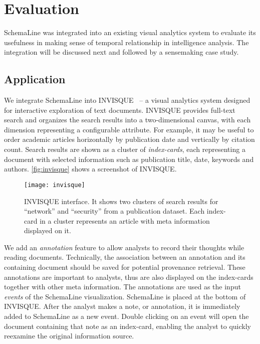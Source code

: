 \section{Evaluation}
\label{sub:sl-evaluation}
SchemaLine was integrated into an existing visual analytics system to evaluate its usefulness in making sense of temporal relationship in intelligence analysis. The integration will be discussed next and followed by a sensemaking case study.

\subsection{Application}
We integrate SchemaLine into INVISQUE~\cite{Wong2011} -- a visual analytics system designed for interactive exploration of text documents. INVISQUE provides full-text search and organizes the search results into a two-dimensional canvas, with each dimension representing a configurable attribute. For example, it may be useful to order academic articles horizontally by publication date and vertically by citation count. Search results are shown as a cluster of \emph{index-cards}, each representing a document with selected information such as publication title, date, keywords and authors. \autoref{fig:invisque} shows a screenshot of INVISQUE.

\begin{figure}[!htb]
	\centering
	\texttt{[image: invisque]}
	\caption{INVISQUE interface. It shows two clusters of search results for ``network'' and ``security'' from a publication dataset. Each index-card in a cluster represents an article with meta information displayed on it.}
	\label{fig:invisque}
\end{figure}

We add an \emph{annotation} feature to allow analysts to record their thoughts while reading documents. Technically, the association between an annotation and its containing document should be saved for potential provenance retrieval. These annotations are important to analysts, thus are also displayed on the index-cards together with other meta information. The annotations are used  as the input \emph{events} of the SchemaLine visualization. SchemaLine is placed at the bottom of INVISQUE. After the analyst makes a note, or annotation, it is immediately added to SchemaLine as a new event. Double clicking on an event will open the document containing that note as an index-card, enabling the analyst to quickly reexamine the original information source.

